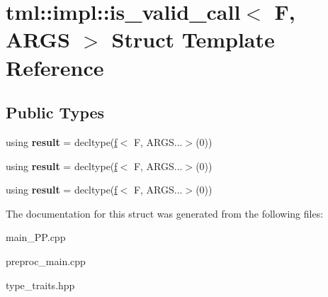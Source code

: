 \hypertarget{structtml_1_1impl_1_1is__valid__call}{\section{tml\+:\+:impl\+:\+:is\+\_\+valid\+\_\+call$<$ F, A\+R\+G\+S $>$ Struct Template Reference}
\label{structtml_1_1impl_1_1is__valid__call}
}
\subsection*{Public Types}
\begin{DoxyCompactItemize}
\item 
\hypertarget{structtml_1_1impl_1_1is__valid__call_a7179118e82b70c13e4a5ad1197c1a598}{using {\bfseries result} = decltype(\hyperlink{structf}{f}$<$ F, A\+R\+G\+S...$>$(0))}\label{structtml_1_1impl_1_1is__valid__call_a7179118e82b70c13e4a5ad1197c1a598}

\item 
\hypertarget{structtml_1_1impl_1_1is__valid__call_a7179118e82b70c13e4a5ad1197c1a598}{using {\bfseries result} = decltype(\hyperlink{structf}{f}$<$ F, A\+R\+G\+S...$>$(0))}\label{structtml_1_1impl_1_1is__valid__call_a7179118e82b70c13e4a5ad1197c1a598}

\item 
\hypertarget{structtml_1_1impl_1_1is__valid__call_a7179118e82b70c13e4a5ad1197c1a598}{using {\bfseries result} = decltype(\hyperlink{structf}{f}$<$ F, A\+R\+G\+S...$>$(0))}\label{structtml_1_1impl_1_1is__valid__call_a7179118e82b70c13e4a5ad1197c1a598}

\end{DoxyCompactItemize}


The documentation for this struct was generated from the following files\+:\begin{DoxyCompactItemize}
\item 
main\+\_\+\+P\+P.\+cpp\item 
preproc\+\_\+main.\+cpp\item 
type\+\_\+traits.\+hpp\end{DoxyCompactItemize}
